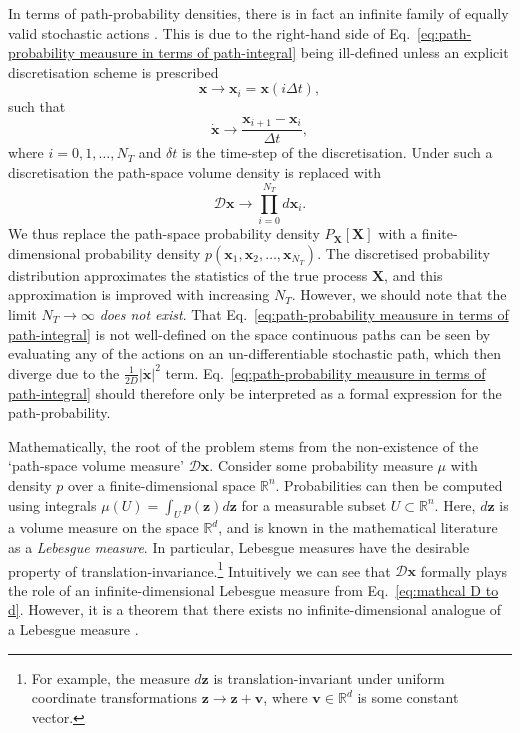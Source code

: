 In terms of path-probability densities, there is in fact an infinite family of equally valid stochastic actions \citep{gladrowExperimentalMeasurementRelative2021}. This is due to the right-hand side of Eq.~\ref{eq:path-probability meausure in terms of path-integral} being ill-defined unless an explicit discretisation scheme is prescribed
\begin{equation}
\mathbf{x} \longrightarrow \mathbf{x}_i = \mathbf{x}(i \Delta t),
\end{equation}
such that
\begin{equation}
\dot{\mathbf{x}} \longrightarrow \frac{\mathbf{x}_{i+1} - \mathbf{x}_i}{\Delta t},
\end{equation}
where $i=0, 1, \dots, N_T$ and $\delta t$ is the time-step of the discretisation. Under such a discretisation the path-space volume density is replaced with
\begin{equation} \label{eq:mathcal D to d}
\mathcal{D}\mathbf{x} \longrightarrow \prod_{i=0}^{N_T} d \mathbf{x}_i.
\end{equation}
We thus replace the path-space probability density $P_\mathbf{X}[\mathbf{X}]$ with a finite-dimensional probability density $p(\mathbf{x}_1, \mathbf{x}_2, \dots, \mathbf{x}_{N_T})$. The discretised probability distribution approximates the statistics of the true process $\mathbf{X}$, and this approximation is improved with increasing $N_T$. However, we should note that the limit $N_T \to \infty$ \textit{does not exist}. That Eq.~\ref{eq:path-probability meausure in terms of path-integral} is not well-defined on the space continuous paths can be seen by evaluating any of the actions on an un-differentiable stochastic path, which then diverge due to the $\frac{1}{2 D} |\dot{\mathbf{x}}|^2$ term. Eq.~\ref{eq:path-probability meausure in terms of path-integral} should therefore only be interpreted as a formal expression for the path-probability.

Mathematically, the root of the problem stems from the non-existence of the `path-space volume measure' $\mathcal{D} \mathbf{x}$. Consider some probability measure $\mu$ with density $p$ over a finite-dimensional space $\mathbb{R}^n$. Probabilities can then be computed using integrals $\mu(U) = \int_U p(\mathbf{z}) d \mathbf{z}$ for a measurable subset  $U \subset \mathbb{R}^n$. Here, $d \mathbf{z}$ is a volume measure on the space $\mathbb{R}^d$, and is known in the mathematical literature as a \textit{Lebesgue measure}. In particular, Lebesgue measures have the desirable property of translation-invariance.\footnote{For example, the measure $d \mathbf{z}$ is translation-invariant under uniform coordinate transformations $\mathbf{z} \to \mathbf{z} + \mathbf{v}$, where $\mathbf{v} \in \mathbb{R}^d$ is some constant vector.} Intuitively we can see that $\mathcal{D} \mathbf{x}$ formally plays the role of an infinite-dimensional Lebesgue measure from Eq.~\ref{eq:mathcal D to d}. However, it is a theorem that there exists no infinite-dimensional analogue of a Lebesgue measure \citep{durrOnsagerMachlupFunctionLagrangian1978a, MeasureIntegrationTheory1972}. 

